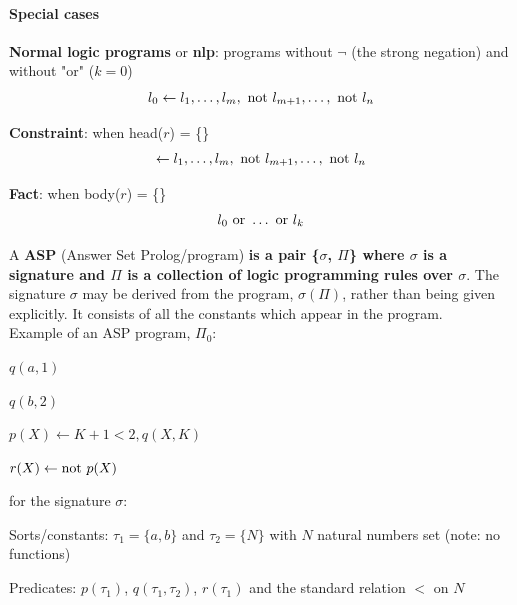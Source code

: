 \documentclass[10pt]{report}
\begin{document}
\paragraph{Special cases} \begin{list}{}{}
	\item \textbf{Normal logic programs} or \textbf{nlp}: programs without $\neg$ (the strong negation) and without "or" ($k=0$)
	$$l_0\leftarrow l_{1},\ldots,l_m,\hbox{ not }l_{m+1},\ldots,\hbox{ not }l_n$$
	\item \textbf{Constraint}: when head($r$) = \{\}
	$$\leftarrow l_{1},\ldots,l_m,\hbox{ not }l_{m+1},\ldots,\hbox{ not }l_n$$
	\item \textbf{Fact}: when body($r$) = \{\}
	$$l_0\hbox{ or }\ldots\hbox{ or }l_k$$
\end{list}
A \textbf{ASP} (Answer Set Prolog/program) \textbf{is a pair \{$\sigma$, $\Pi$\} where $\sigma$ is a signature and $\Pi$ is a collection of logic programming rules over $\sigma$}. The signature $\sigma$ may be derived from the program, $\sigma(\Pi)$, rather than being given explicitly. It consists of all the constants which appear in the program.\\
Example of an ASP program, $\Pi_0$:
\begin{list}{}{}
	\item $q(a,1)$
	\item $q(b,2)$
	\item $p(X)\leftarrow K+1<2, q(X,K)$
	\item $r(X)\leftarrow\hbox{not }p(X)$
\end{list} for the signature $\sigma$:
\begin{list}{}{}
	\item Sorts/constants: $\tau_1=\{a,b\}$ and $\tau_2 = \{N\}$ with $N$ natural numbers set (note: no functions)
	\item Predicates: $p(\tau_1)$, $q(\tau_1, \tau_2)$, $r(\tau_1)$ and the standard relation $<$ on $N$
\end{list}
\end{document}
